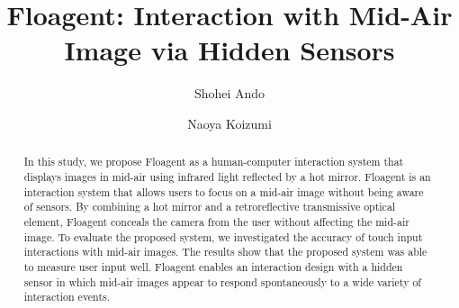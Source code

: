 \documentclass[sigconf]{acmart}
\begin{document}
\title{Floagent: Interaction with Mid-Air Image via Hidden Sensors}

\author{Shohei Ando}

\author{Naoya Koizumi}

\renewcommand{\shortauthors}{Trovato et al.}

\begin{abstract}
  In this study, we propose Floagent as a human-computer interaction system that displays images in mid-air using infrared light reflected by a hot mirror. 
  Floagent is an interaction system that allows users to focus on a mid-air image without being aware of sensors.
  By combining a hot mirror and a retroreflective transmissive optical element, Floagent conceals the camera from the user without affecting the mid-air image.
  To evaluate the proposed system, we investigated the accuracy of touch input interactions with mid-air images. 
  The results show that the proposed system was able to measure user input well.
  Floagent enables an interaction design with a hidden sensor in which mid-air images appear to respond spontaneously to a wide variety of interaction events. 
\end{abstract}
\end{document}
